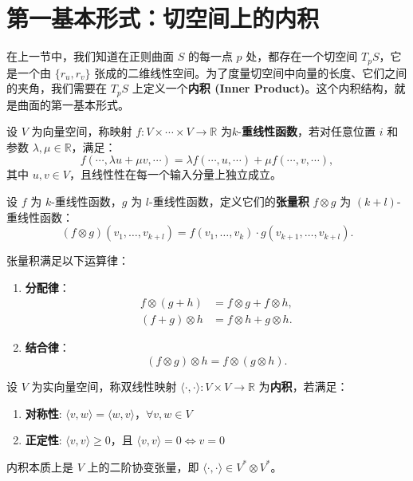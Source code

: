 \documentclass[lang=cn,10pt,thmcnt=section]{elegantbook}
\begin{document}
\section{第一基本形式：切空间上的内积}
在上一节中，我们知道在正则曲面 $S$ 的每一点 $p$ 处，都存在一个切空间 $T_p S$，它是一个由 $\{r_u, r_v\}$ 张成的二维线性空间。为了度量切空间中向量的长度、它们之间的夹角，我们需要在 $T_p S$ 上定义一个\textbf{内积 (Inner Product)}。这个内积结构，就是曲面的第一基本形式。
\begin{definition}[多线性函数]
设 $V$ 为向量空间，称映射 $f: V \times \cdots \times V \to \mathbb{R}$ 为$k$-\textbf{重线性函数}，若对任意位置 $i$ 和参数 $\lambda, \mu \in \mathbb{R}$，满足：
\[
f(\cdots, \lambda u + \mu v, \cdots) = \lambda f(\cdots, u, \cdots) + \mu f(\cdots, v, \cdots),
\]
其中 $u, v \in V$，且线性性在每一个输入分量上独立成立。
\end{definition}
\begin{definition}[张量积]
设 $f$ 为 $k$-重线性函数，$g$ 为 $l$-重线性函数，定义它们的\textbf{张量积} $f \otimes g$ 为 $(k+l)$-重线性函数：
\[
(f \otimes g)(v_1, \ldots, v_{k+l}) = f(v_1, \ldots, v_k) \cdot g(v_{k+1}, \ldots, v_{k+l}).
\]
\end{definition}
\begin{proposition}
张量积满足以下运算律：
\begin{enumerate}
\item \textbf{分配律}：
\[
\begin{aligned}
f \otimes (g + h) &= f \otimes g + f \otimes h, \\
(f + g) \otimes h &= f \otimes h + g \otimes h.
\end{aligned}
\]
\item \textbf{结合律}：
\[
(f \otimes g) \otimes h = f \otimes (g \otimes h).
\]
\end{enumerate}
\end{proposition}
\begin{definition}[内积]
设 $V$ 为实向量空间，称双线性映射 $\langle \cdot, \cdot \rangle: V \times V \to \mathbb{R}$ 为\textbf{内积}，若满足：
\begin{enumerate}
\item \textbf{对称性}: $\langle v, w \rangle = \langle w, v \rangle$，$\forall v,w \in V$
\item \textbf{正定性}: $\langle v, v \rangle \geq 0$，且 $\langle v, v \rangle = 0 \iff v = 0$
\end{enumerate}
\end{definition}
\begin{proposition}[内积的张量积表示]
内积本质上是 $V$ 上的二阶协变张量，即 $\langle \cdot, \cdot \rangle \in V^* \otimes V^*$。
\end{proposition}
\end{document}
